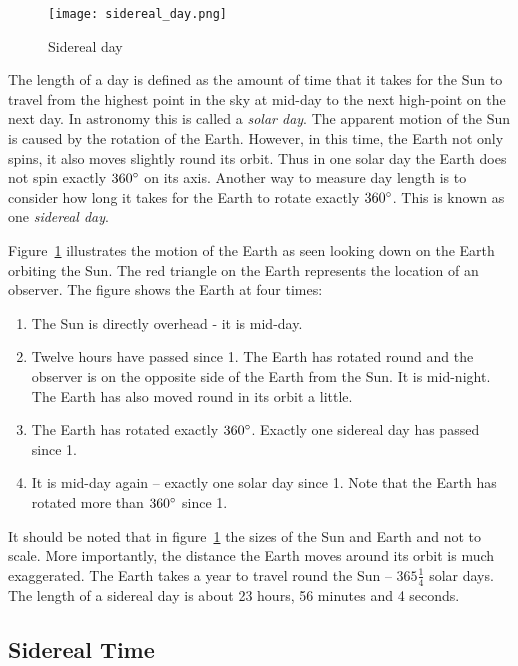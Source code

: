 \begin{figure}[ht]
\centering\texttt{[image: sidereal\_day.png]}
\caption{Sidereal day}
\label{fig:SiderealDay}
\end{figure}

The length of a day is defined as the amount of time that it takes for
the Sun to travel from the highest point in the sky at mid-day to the
next high-point on the next day. In astronomy this is called a
\emph{solar day}. The apparent motion of the Sun is caused by the
rotation of the Earth. However, in this time, the Earth not only spins,
it also moves slightly round its orbit. Thus in one solar day the Earth
does not spin exactly $360\degree$ on its axis. Another way to measure day
length is to consider how long it takes for the Earth to rotate exactly
$360\degree$. This is known as one \emph{sidereal day}.

Figure~\ref{fig:SiderealDay} illustrates the motion of the Earth as
seen looking down on the Earth orbiting the Sun. The red triangle on the
Earth represents the location of an observer. The figure shows the Earth
at four times:

\begin{enumerate}
\item
  The Sun is directly overhead - it is mid-day.
\item
  Twelve hours have passed since 1. The Earth has rotated round and the
  observer is on the opposite side of the Earth from the Sun. It is
  mid-night. The Earth has also moved round in its orbit a little.
\item
  The Earth has rotated exactly $360\degree$. Exactly one sidereal day has
  passed since 1.
\item
  It is mid-day again -- exactly one solar day since 1. Note that the
  Earth has rotated more than $360\degree$ since 1.
\end{enumerate}

\noindent It should be noted that in figure~\ref{fig:SiderealDay} the sizes of
the Sun and Earth and not to scale. More importantly, the distance the
Earth moves around its orbit is much exaggerated. The Earth takes a
year to travel round the Sun --
$365\frac{1}{4}$ solar days. The length of a
sidereal day is about 23 hours, 56 minutes and 4 seconds.

\subsection{Sidereal Time}
\label{sec:Concepts:SiderealTime}


